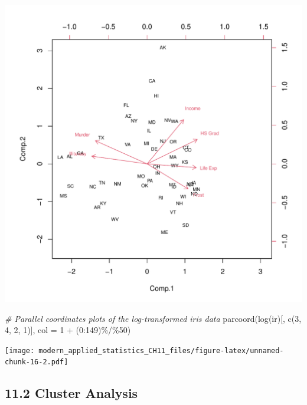 \documentclass[
]{article}
\newenvironment{Shaded}{\begin{snugshade}}{\end{snugshade}}
\newcommand{\AttributeTok}[1]{\textcolor[rgb]{0.77,0.63,0.00}{#1}}
\newcommand{\CommentTok}[1]{\textcolor[rgb]{0.56,0.35,0.01}{\textit{#1}}}
\newcommand{\DecValTok}[1]{\textcolor[rgb]{0.00,0.00,0.81}{#1}}
\newcommand{\FunctionTok}[1]{\textcolor[rgb]{0.00,0.00,0.00}{#1}}
\newcommand{\NormalTok}[1]{#1}
\newcommand{\SpecialCharTok}[1]{\textcolor[rgb]{0.00,0.00,0.00}{#1}}
\begin{document}
\includegraphics{modern_applied_statistics_CH11_files/figure-latex/unnamed-chunk-16-1.pdf}

\begin{Shaded}
\begin{Highlighting}[]
\CommentTok{\# Parallel coordinates plots of the log{-}transformed iris data}
\FunctionTok{parcoord}\NormalTok{(}\FunctionTok{log}\NormalTok{(ir)[, }\FunctionTok{c}\NormalTok{(}\DecValTok{3}\NormalTok{, }\DecValTok{4}\NormalTok{, }\DecValTok{2}\NormalTok{, }\DecValTok{1}\NormalTok{)], }\AttributeTok{col =} \DecValTok{1} \SpecialCharTok{+}\NormalTok{ (}\DecValTok{0}\SpecialCharTok{:}\DecValTok{149}\NormalTok{)}\SpecialCharTok{\%/\%}\DecValTok{50}\NormalTok{)}
\end{Highlighting}
\end{Shaded}

\texttt{[image: modern\_applied\_statistics\_CH11\_files/figure-latex/unnamed-chunk-16-2.pdf]}

\newpage

\hypertarget{cluster-analysis}{%
\subsection{11.2 Cluster Analysis}\label{cluster-analysis}}
\end{document}
